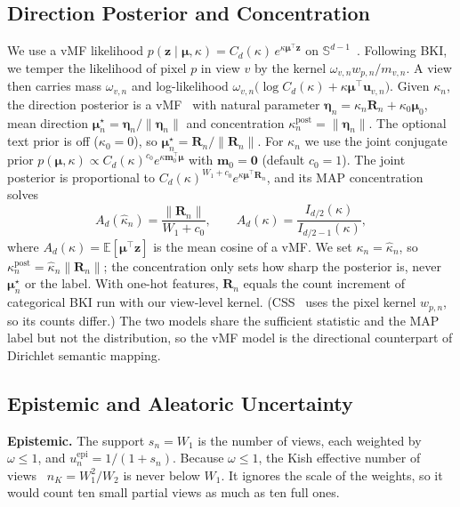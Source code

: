 \documentclass[journal]{IEEEtran}
\newcommand{\R}{\mathbf{R}}
\newcommand{\zv}{\mathbf{z}}
\newcommand{\muv}{\boldsymbol{\mu}}
\newcommand{\etav}{\boldsymbol{\eta}}
\newcommand{\Sph}{\mathbb{S}}
\begin{document}
\subsection{Direction Posterior and Concentration}
\label{sec:posterior}
We use a vMF likelihood $p(\zv\mid\muv,\kappa)=C_d(\kappa)\,e^{\kappa\muv^\top\zv}$ on $\Sph^{d-1}$~\cite{mardia2000directional, banerjee2005vmf}. Following BKI, we temper the likelihood of pixel $p$ in view $v$ by the kernel $\omega_{v,n}w_{p,n}/m_{v,n}$. A view then carries mass $\omega_{v,n}$ and log-likelihood $\omega_{v,n}\big(\log C_d(\kappa)+\kappa\muv^\top\mathbf{u}_{v,n}\big)$. Given $\kappa_n$, the direction posterior is a vMF~\cite{mardia1976bayesian} with natural parameter $\etav_n=\kappa_n\R_n+\kappa_0\muv_0$, mean direction $\muv^\star_n=\etav_n/\lVert\etav_n\rVert$ and concentration $\kappa^{\mathrm{post}}_n=\lVert\etav_n\rVert$. The optional text prior is off ($\kappa_0=0$), so $\muv^\star_n=\R_n/\lVert\R_n\rVert$. For $\kappa_n$ we use the joint conjugate prior $p(\muv,\kappa)\propto C_d(\kappa)^{c_0}e^{\kappa\mathbf{m}_0^\top\muv}$ with $\mathbf{m}_0=\mathbf{0}$ (default $c_0=1$). The joint posterior is proportional to $C_d(\kappa)^{W_1+c_0}e^{\kappa\muv^\top\R_n}$, and its MAP concentration solves
\begin{equation}
A_d(\hat\kappa_n)=\frac{\lVert\R_n\rVert}{W_1+c_0},\qquad
A_d(\kappa)=\frac{I_{d/2}(\kappa)}{I_{d/2-1}(\kappa)},
\label{eq:kappa}
\end{equation}
where $A_d(\kappa)=\mathbb{E}[\muv^\top\zv]$ is the mean cosine of a vMF. We set $\kappa_n=\hat\kappa_n$, so $\kappa^{\mathrm{post}}_n=\hat\kappa_n\lVert\R_n\rVert$; the concentration only sets how sharp the posterior is, never $\muv^\star_n$ or the label. With one-hot features, $\R_n$ equals the count increment of categorical BKI run with our view-level kernel. (CSS~\cite{wilson2025css} uses the pixel kernel $w_{p,n}$, so its counts differ.) The two models share the sufficient statistic and the MAP label but not the distribution, so the vMF model is the directional counterpart of Dirichlet semantic mapping.

\subsection{Epistemic and Aleatoric Uncertainty}
\label{sec:uncertainty}
\textbf{Epistemic.} The support $s_n=W_1$ is the number of views, each weighted by $\omega\le1$, and $u^{\mathrm{epi}}_n=1/(1+s_n)$. Because $\omega\le1$, the Kish effective number of views~\cite{kish1965survey} $n_K=W_1^2/W_2$ is never below $W_1$. It ignores the scale of the weights, so it would count ten small partial views as much as ten full ones.
\end{document}

